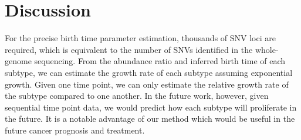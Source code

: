 \documentclass{article}
\begin{document}
\section{Discussion}
For the precise birth time parameter estimation, thousands of SNV loci are required, which is equivalent to the number of SNVs identified in the whole-genome sequencing. From the abundance ratio and inferred birth time of each subtype, we can estimate the growth rate of each subtype assuming exponential growth. Given one time point, we can only estimate the relative growth rate of the subtype compared to one another. In the future work, however, given sequential time point data, we would predict how each subtype will proliferate in the future. It is a notable advantage of our method which would be useful in the future cancer prognosis and treatment.
\end{document}
